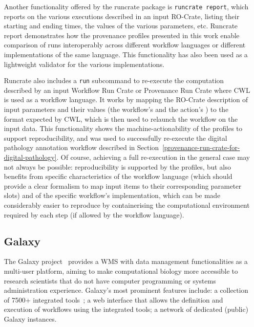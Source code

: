 \documentclass[10pt,letterpaper]{article}
\newcommand{\termsorg}[1]{\href{https://schema.org/#1}{\color{black}{\emph{s:#1}}}}
\newcommand{\termbsp}[1]{\href{https://bioschemas.org/properties/#1}{\color{black}{\emph{bsp:#1}}}}
\begin{document}
Another functionality offered by the runcrate package is \texttt{runcrate report}, which reports on the various executions described in an input RO-Crate, listing their starting and ending times, the values of the various parameters, etc.
Runcrate report demonstrates how the provenance profiles presented in this work enable comparison of runs interoperably across different workflow languages or different implementations of the same language.
This functionality has also been used as a lightweight validator for the various implementations.

Runcrate also includes a \texttt{run} subcommand to re-execute the computation described by an input Workflow Run Crate or Provenance Run Crate where CWL is used as a workflow language.
It works by mapping the RO-Crate description of input parameters and their values (the workflow's
\termbsp{input} and the action's \termsorg{object}) to the format expected by CWL, which is then used to relaunch the workflow on the input data.
This functionality shows the machine-actionability of the profiles to support reproducibility, and was used to successfully re-execute the digital pathology annotation workflow described in Section~\ref{provenance-run-crate-for-digital-pathology}.
%
Of course, achieving a full re-execution in the general case may not always be possible: reproducibility is supported by the profiles, but also benefits from specific characteristics of the workflow language (which should provide a clear formalism to map input items to their corresponding parameter slots) and of the specific workflow's implementation, which can be made considerably easier to reproduce by containerising the computational environment required by each step (if allowed by the workflow language).


\subsection{Galaxy}\label{galaxy}

The Galaxy project~\cite{Galaxy 2022} provides a WMS with data management functionalities as a multi-user platform, aiming to make computational biology more accessible to research scientists that do not have computer programming or systems administration experience.
Galaxy's most prominent features include: a collection of 7500+ integrated tools~\cite{Blankenberg 2014};
a web interface that allows the definition and execution of workflows using the integrated tools; a network of dedicated (public) Galaxy instances.
\end{document}
